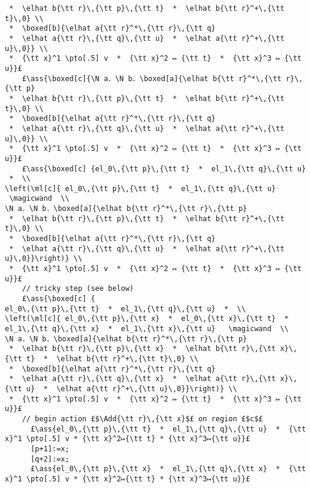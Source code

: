 \documentclass[12pt,a4paper]{article}
\makeatletter
\newcommand{\ml}[2][t]{\mbox{\mdseries\begin{tabular}[#1]{@{}L@{}}#2\end{tabular}}}
\newcommand{\ass}[1]{\ensuremath{{\color{blue}\left\{\ml[c]{#1}\right\}}}}
\makeatother
\begin{document}
\begin{lstlisting}
 *  \elhat b{\tt r}\,{\tt p}\,{\tt t}  *  \elhat b{\tt r}^+\,{\tt t}\,0} \\ 
 *  \boxed[b]{\elhat a{\tt r}^*\,{\tt r}\,{\tt q} 
 *  \elhat a{\tt r}\,{\tt q}\,{\tt u}  *  \elhat a{\tt r}^+\,{\tt u}\,0}} \\ 
 *  {\tt x}^1 \pto[.5] v  *  {\tt x}^2 ↦ {\tt t}  *  {\tt x}^3 ↦ {\tt u}}£
    £\ass{\boxed[c]{\N a．\N b．\boxed[a]{\elhat b{\tt r}^*\,{\tt r}\,{\tt p} 
 *  \elhat b{\tt r}\,{\tt p}\,{\tt t}  *  \elhat b{\tt r}^+\,{\tt t}\,0} \\ 
 *  \boxed[b]{\elhat a{\tt r}^*\,{\tt r}\,{\tt q} 
 *  \elhat a{\tt r}\,{\tt q}\,{\tt u}  *  \elhat a{\tt r}^+\,{\tt u}\,0}} \\ 
 *  {\tt x}^1 \pto[.5] v  *  {\tt x}^2 ↦ {\tt t}  *  {\tt x}^3 ↦ {\tt u}}£
    £\ass{\boxed[c] {el_0\,{\tt p}\,{\tt t}  *  el_1\,{\tt q}\,{\tt u}  *  \\ 
\left(\ml[c]{ el_0\,{\tt p}\,{\tt t}  *  el_1\,{\tt q}\,{\tt u}  \magicwand  \\
\N a．\N b．\boxed[a]{\elhat b{\tt r}^*\,{\tt r}\,{\tt p} 
 *  \elhat b{\tt r}\,{\tt p}\,{\tt t}  *  \elhat b{\tt r}^+\,{\tt t}\,0} \\ 
 *  \boxed[b]{\elhat a{\tt r}^*\,{\tt r}\,{\tt q} 
 *  \elhat a{\tt r}\,{\tt q}\,{\tt u}  *  \elhat a{\tt r}^+\,{\tt u}\,0}}\right)} \\
 *  {\tt x}^1 \pto[.5] v  *  {\tt x}^2 ↦ {\tt t}  *  {\tt x}^3 ↦ {\tt u}}£
    // tricky step (see below) 
    £\ass{\boxed[c] {
el_0\,{\tt p}\,{\tt t}  *  el_1\,{\tt q}\,{\tt u}  *  \\ 
\left(\ml[c]{ el_0\,{\tt p}\,{\tt x}  *  el_0\,{\tt x}\,{\tt t}  *  el_1\,{\tt q}\,{\tt x}  *  el_1\,{\tt x}\,{\tt u}   \magicwand  \\
\N a．\N b．\boxed[a]{\elhat b{\tt r}^*\,{\tt r}\,{\tt p} 
 *  \elhat b{\tt r}\,{\tt p}\,{\tt x}  *  \elhat b{\tt r}\,{\tt x}\,{\tt t}  *  \elhat b{\tt r}^+\,{\tt t}\,0} \\ 
 *  \boxed[b]{\elhat a{\tt r}^*\,{\tt r}\,{\tt q} 
 *  \elhat a{\tt r}\,{\tt q}\,{\tt x}  *  \elhat a{\tt r}\,{\tt x}\,{\tt u}  *  \elhat a{\tt r}^+\,{\tt u}\,0}}\right)} \\
 *  {\tt x}^1 \pto[.5] v  *  {\tt x}^2 ↦ {\tt t}  *  {\tt x}^3 ↦ {\tt u}}£
    // begin action £$\Add{\tt r}\,{\tt x}$£ on region £$c$£
      £\ass{el_0\,{\tt p}\,{\tt t}  *  el_1\,{\tt q}\,{\tt u}  *  {\tt x}^1 \pto[.5] v * {\tt x}^2↦{\tt t} * {\tt x}^3↦{\tt u}}£
      [p+1]:=x;
      [q+2]:=x;
      £\ass{el_0\,{\tt p}\,{\tt x}  *  el_1\,{\tt q}\,{\tt x}  *  {\tt x}^1 \pto[.5] v * {\tt x}^2↦{\tt t} * {\tt x}^3↦{\tt u}}£

\end{lstlisting}
\end{document}
